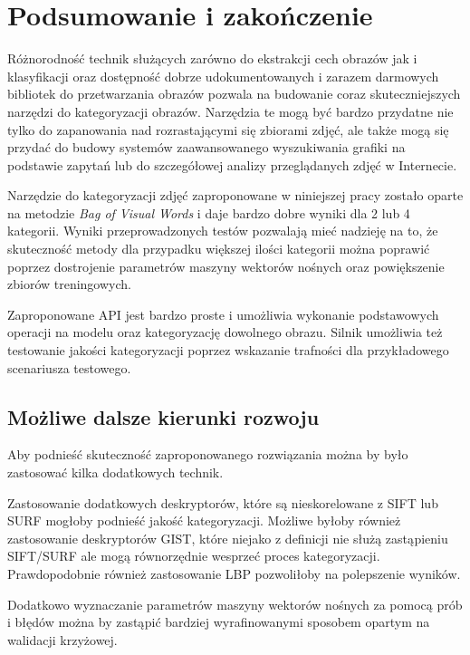 \chapter{Podsumowanie i zakończenie}

Różnorodność technik służących zarówno do ekstrakcji cech obrazów jak i klasyfikacji oraz dostępność dobrze udokumentowanych i zarazem darmowych bibliotek do przetwarzania obrazów pozwala na budowanie coraz skuteczniejszych narzędzi do kategoryzacji obrazów. Narzędzia te mogą być bardzo przydatne nie tylko do zapanowania nad rozrastającymi się zbiorami zdjęć, ale także mogą się przydać do budowy systemów zaawansowanego wyszukiwania grafiki na podstawie zapytań lub do szczegółowej analizy przeglądanych zdjęć w Internecie.

Narzędzie do kategoryzacji zdjęć zaproponowane w niniejszej pracy zostało oparte na metodzie \emph{Bag of Visual Words} i daje bardzo dobre wyniki dla 2 lub 4 kategorii. Wyniki przeprowadzonych testów pozwalają mieć nadzieję na to, że skuteczność metody dla przypadku większej ilości kategorii można poprawić poprzez dostrojenie parametrów maszyny wektorów nośnych oraz powiększenie zbiorów treningowych.

Zaproponowane API jest bardzo proste i umożliwia wykonanie podstawowych operacji na modelu oraz kategoryzację dowolnego obrazu. Silnik umożliwia też testowanie jakości kategoryzacji poprzez wskazanie trafności dla przykładowego scenariusza testowego. 

\section{Możliwe dalsze kierunki rozwoju}

Aby podnieść skuteczność zaproponowanego rozwiązania można by było zastosować kilka dodatkowych technik.

Zastosowanie dodatkowych deskryptorów, które są nieskorelowane z SIFT lub SURF mogłoby podnieść jakość kategoryzacji. Możliwe byłoby również zastosowanie deskryptorów GIST, które niejako z definicji nie służą zastąpieniu SIFT/SURF ale mogą równorzędnie wesprzeć proces kategoryzacji. Prawdopodobnie również zastosowanie LBP pozwoliłoby na polepszenie wyników.  

Dodatkowo wyznaczanie parametrów maszyny wektorów nośnych za pomocą prób i błędów można by zastąpić bardziej wyrafinowanymi sposobem opartym na walidacji krzyżowej.